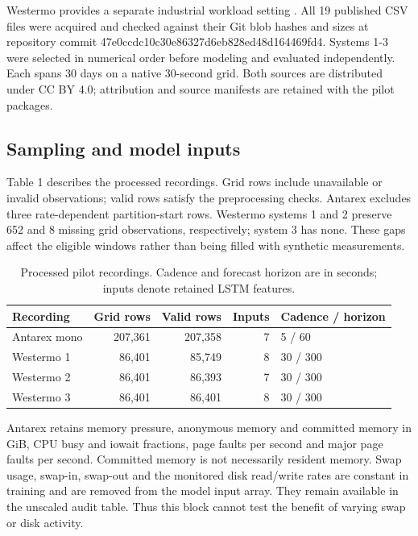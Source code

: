 \documentclass[10pt,a4paper,twocolumn]{article}
\begin{document}
Westermo provides a separate industrial workload setting \cite{ref6}. All 19 published CSV files were acquired and checked against their Git blob hashes and sizes at repository commit 47e0ccdc10c30e86327d6eb828ed48d164469fd4. Systems 1-3 were selected in numerical order before modeling and evaluated independently. Each spans 30 days on a native 30-second grid. Both sources are distributed under CC BY 4.0; attribution and source manifests are retained with the pilot packages.

\subsection{Sampling and model inputs}

Table 1 describes the processed recordings. Grid rows include unavailable or invalid observations; valid rows satisfy the preprocessing checks. Antarex excludes three rate-dependent partition-start rows. Westermo systems 1 and 2 preserve 652 and 8 missing grid observations, respectively; system 3 has none. These gaps affect the eligible windows rather than being filled with synthetic measurements.

\begin{table}[tbp]
\centering
\caption{Processed pilot recordings. Cadence and forecast horizon are in seconds; inputs denote retained LSTM features.}
\label{tab:1}
\fontsize{8.5}{10.2}\selectfont
\setlength{\tabcolsep}{2.4pt}
\renewcommand{\arraystretch}{1.17}
\begin{tabularx}{\linewidth}{@{}L{1.15}R{1.02}R{1.02}R{0.57}L{1.24}@{}}
\toprule
\textbf{Recording} & \textbf{Grid rows} & \textbf{Valid rows} & \textbf{Inputs} & \textbf{Cadence / horizon} \\
\midrule
Antarex mono & 207,361 & 207,358 & 7 & 5 / 60 \\
Westermo 1 & 86,401 & 85,749 & 8 & 30 / 300 \\
Westermo 2 & 86,401 & 86,393 & 7 & 30 / 300 \\
Westermo 3 & 86,401 & 86,401 & 8 & 30 / 300 \\
\bottomrule
\end{tabularx}
\end{table}

Antarex retains memory pressure, anonymous memory and committed memory in GiB, CPU busy and iowait fractions, page faults per second and major page faults per second. Committed memory is not necessarily resident memory. Swap usage, swap-in, swap-out and the monitored disk read/write rates are constant in training and are removed from the model input array. They remain available in the unscaled audit table. Thus this block cannot test the benefit of varying swap or disk activity.
\end{document}
